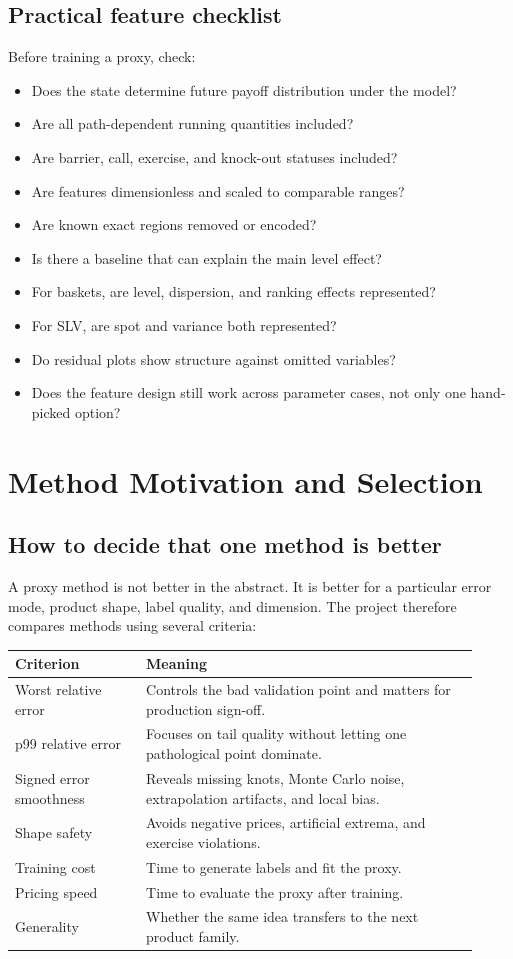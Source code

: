 \documentclass[11pt,oneside]{book}
\theoremstyle{definition}
\begin{document}
\section{Practical feature checklist}
Before training a proxy, check:
\begin{itemize}
  \item Does the state determine future payoff distribution under the model?
  \item Are all path-dependent running quantities included?
  \item Are barrier, call, exercise, and knock-out statuses included?
  \item Are features dimensionless and scaled to comparable ranges?
  \item Are known exact regions removed or encoded?
  \item Is there a baseline that can explain the main level effect?
  \item For baskets, are level, dispersion, and ranking effects represented?
  \item For SLV, are spot and variance both represented?
  \item Do residual plots show structure against omitted variables?
  \item Does the feature design still work across parameter cases, not only one
        hand-picked option?
\end{itemize}

\chapter{Method Motivation and Selection}

\section{How to decide that one method is better}
A proxy method is not better in the abstract. It is better for a particular
error mode, product shape, label quality, and dimension. The project therefore
compares methods using several criteria:
\begin{longtable}{@{}>{\raggedright\arraybackslash}p{0.26\linewidth}>{\raggedright\arraybackslash}p{0.66\linewidth}@{}}
\toprule
Criterion & Meaning\\
\midrule
Worst relative error & Controls the bad validation point and matters for production sign-off.\\
p99 relative error & Focuses on tail quality without letting one pathological point dominate.\\
Signed error smoothness & Reveals missing knots, Monte Carlo noise, extrapolation artifacts, and local bias.\\
Shape safety & Avoids negative prices, artificial extrema, and exercise violations.\\
Training cost & Time to generate labels and fit the proxy.\\
Pricing speed & Time to evaluate the proxy after training.\\
Generality & Whether the same idea transfers to the next product family.\\
\bottomrule
\end{longtable}
\end{document}
